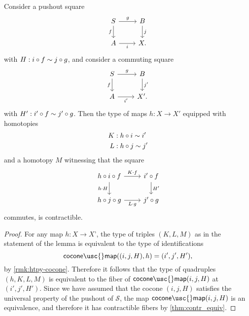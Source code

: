 \begin{lem}\label{lem:unique-mapping-property-pushout}
  Consider a pushout square
  \begin{equation*}
    \begin{tikzcd}
      S \arrow[r,"g"] \arrow[d,swap,"f"] & B \arrow[d,"j"] \\
      A \arrow[r,swap,"i"] & X.
    \end{tikzcd}
  \end{equation*}
  with $H:i\circ f \sim j\circ g$, and consider a commuting square
  \begin{equation*}
    \begin{tikzcd}
      S \arrow[r,"g"] \arrow[d,swap,"f"] & B \arrow[d,"{j'}"] \\
      A \arrow[r,swap,"{i'}"] & X'.
    \end{tikzcd}
  \end{equation*}
  with $H':i'\circ f \sim j'\circ g$. Then the type of maps $h:X\to X'$ equipped with homotopies
  \begin{align*}
    K & : h\circ i \sim i' \\
    L & : h\circ j \sim j'
  \end{align*}
  and a homotopy $M$ witnessing that the square
  \begin{equation*}
    \begin{tikzcd}
      h\circ i\circ f \arrow[r,"K\cdot f"] \arrow[d,swap,"h\cdot H"] & i' \circ f \arrow[d,"{H'}"] \\
      h\circ j\circ g \arrow[r,swap,"L\cdot g"] & j'\circ g
    \end{tikzcd}
  \end{equation*}
  commutes, is contractible.
\end{lem}

\begin{proof}
  For any map $h:X\to X$', the type of triples $(K,L,M)$ as in the statement of the lemma is equivalent to the type of identifications
  \begin{equation*}
    \mathsf{cocone\usc{}map}((i,j,H),h)=(i',j',H'),
  \end{equation*}
  by \cref{rmk:htpy-cocone}. Therefore it follows that the type of quadruples $(h,K,L,M)$ is equivalent to the fiber of $\mathsf{cocone\usc{}map}(i,j,H)$ at $(i',j',H')$. Since we have assumed that the cocone $(i,j,H)$ satisfies the universal property of the pushout of $\mathcal{S}$, the map $\mathsf{cocone\usc{}map}(i,j,H)$ is an equivalence, and therefore it has contractible fibers by \cref{thm:contr_equiv}.
\end{proof}

